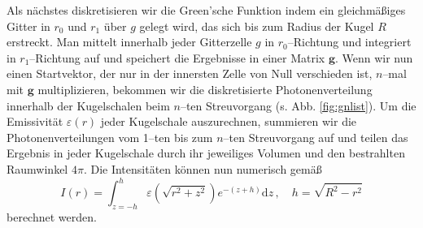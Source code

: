 	Als nächstes diskretisieren wir die Green'sche Funktion indem ein gleichmäßiges Gitter in $r_0$ und $r_1$ über $g$ gelegt wird, das sich bis zum Radius der Kugel $R$ erstreckt. Man mittelt innerhalb jeder Gitterzelle $g$ in $r_0$--Richtung und integriert in $r_1$--Richtung auf und speichert die Ergebnisse in einer Matrix $\mathbf{g}$. Wenn wir nun einen Startvektor, der nur in der innersten Zelle von Null verschieden ist, $n$--mal mit $\mathbf{g}$ multiplizieren, bekommen wir die diskretisierte Photonenverteilung innerhalb der Kugelschalen beim $n$--ten Streuvorgang (s. Abb. \ref{fig:gnlist}). Um die Emissivität $\varepsilon(r)$ jeder Kugelschale auszurechnen, summieren wir die Photonenverteilungen vom 1--ten bis zum $n$--ten Streuvorgang auf und teilen das Ergebnis in jeder Kugelschale durch ihr jeweiliges Volumen und den bestrahlten Raumwinkel $4\pi$. Die Intensitäten können nun numerisch gemäß
	\begin{equation}
		I(r) = \int_{z=-h}^h \varepsilon\left(\sqrt{r^2+z^2}\right) e^{-(z+h)}\text{d}z\,,\quad h=\sqrt{R^2-r^2}
		\label{eq:testprob_intensity_calculation}
	\end{equation}
	berechnet werden.
	
	
	
